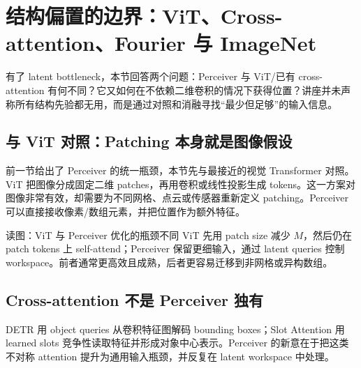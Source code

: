 \section{结构偏置的边界：ViT、Cross-attention、Fourier 与 ImageNet}

有了 latent bottleneck，本节回答两个问题：Perceiver 与 ViT/已有 cross-attention 有何不同？它又如何在不依赖二维卷积的情况下获得位置？讲座并未声称所有结构先验都无用，而是通过对照和消融寻找“最少但足够”的输入信息。

\subsection{与 ViT 对照：Patching 本身就是图像假设}

前一节给出了 Perceiver 的统一瓶颈，本节先与最接近的视觉 Transformer 对照。ViT 把图像分成固定二维 patches，再用卷积或线性投影生成 tokens。这一方案对图像非常有效，却需要为不同网格、点云或传感器重新定义 patching。Perceiver 可以直接接收像素/数组元素，并把位置作为额外特征。


\begin{knowledgebox}{读图：ViT 与 Perceiver 优化的瓶颈不同}
ViT 先用 patch size 减少 $M$，然后仍在 patch tokens 上 self-attend；Perceiver 保留更细输入，通过 latent queries 控制 workspace。前者通常更高效且成熟，后者更容易迁移到非网格或异构数组。
\end{knowledgebox}


\subsection{Cross-attention 不是 Perceiver 独有}

DETR 用 object queries 从卷积特征图解码 bounding boxes；Slot Attention 用 learned slots 竞争性读取特征并形成对象中心表示。Perceiver 的新意在于把这类不对称 attention 提升为通用输入瓶颈，并反复在 latent workspace 中处理。


